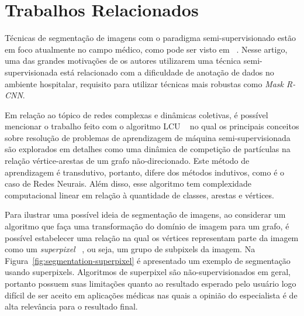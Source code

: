 \chapter{Trabalhos Relacionados}\label{cap:trabalhos-relacionados}

Técnicas de segmentação de imagens com o paradigma semi-supervisionado
estão em foco atualmente no campo médico, como pode ser visto em
~\cite{LuoSemiSupervised2021}. Nesse artigo, uma das grandes motivações
de os autores utilizarem uma técnica semi-supervisionada
está relacionado com a dificuldade de anotação de dados no ambiente
hospitalar, requisito para utilizar técnicas mais robustas como
\textit{Mask R-CNN}.

Em relação ao tópico de redes complexas e dinâmicas coletivas, é
possível mencionar o trabalho feito com o algoritmo \gls{LCU}
~\cite{VerriNetworkUnfoldingMap2018} no qual os principais conceitos
sobre resolução de problemas de aprendizagem de máquina
semi-supervisionada são explorados em detalhes como uma dinâmica de
competição de partículas na relação vértice-arestas de um grafo
não-direcionado. Este método de aprendizagem é transdutivo, portanto,
difere dos métodos indutivos, como é o caso de Redes Neurais. Além
disso, esse algoritmo tem complexidade computacional linear em relação
à quantidade de classes, arestas e vértices.

Para ilustrar uma possível ideia de segmentação de imagens, ao
considerar um algoritmo que faça uma transformação do domínio de
imagem para um grafo, é possível estabelecer uma relação na qual os
vértices representam parte da imagem como um \textit{superpixel}
~\cite{SuperpixelSurvey2020}, ou seja, um grupo de subpixels da
imagem. Na Figura~\ref{fig:segmentation-superpixel} é apresentado um
exemplo de segmentação usando superpixels. Algoritmos de superpixel
são não-supervisionados em geral, portanto possuem suas limitações
quanto ao resultado esperado pelo usuário \textendash\hfill logo
difícil de ser aceito em aplicações médicas nas quais a opinião do
especialista é de alta relevância para o resultado final.

\begin{figure}[!h]
        \captionsetup{width=9cm}
		\centering
\end{figure}



